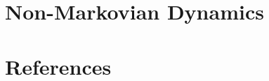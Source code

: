 \documentclass[12pt]{article}
\begin{document}
\section{Non-Markovian Dynamics  }




\newpage

\section{References}






\newpage







\end{document}
